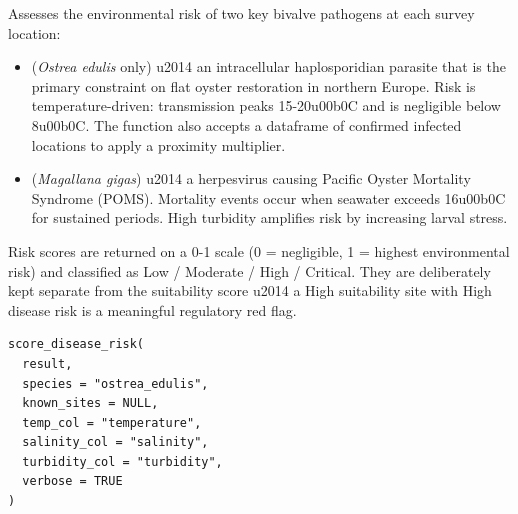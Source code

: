 \documentclass[a4paper]{book}
\begin{document}
\begin{Description}
Assesses the environmental risk of two key bivalve pathogens at each survey
location:
\begin{itemize}

\item{}  (\emph{Ostrea edulis} only) \bsl{}u2014 an intracellular haplosporidian
parasite that is the primary constraint on flat oyster restoration in northern
Europe. Risk is temperature-driven: transmission peaks 15-20\bsl{}u00b0C and is
negligible below 8\bsl{}u00b0C. The function also accepts a  dataframe of
confirmed infected locations to apply a proximity multiplier.
\item{}  (\emph{Magallana gigas}) \bsl{}u2014 a herpesvirus causing Pacific
Oyster Mortality Syndrome (POMS). Mortality events occur when seawater
exceeds 16\bsl{}u00b0C for sustained periods. High turbidity amplifies risk by
increasing larval stress.

\end{itemize}


Risk scores are returned on a 0-1 scale (0 = negligible, 1 = highest
environmental risk) and classified as Low / Moderate / High / Critical.
They are deliberately kept separate from the suitability score \bsl{}u2014 a High
suitability site with High disease risk is a meaningful regulatory red flag.
\end{Description}
%
\begin{Usage}
\begin{verbatim}
score_disease_risk(
  result,
  species = "ostrea_edulis",
  known_sites = NULL,
  temp_col = "temperature",
  salinity_col = "salinity",
  turbidity_col = "turbidity",
  verbose = TRUE
)
\end{verbatim}
\end{Usage}
%
\end{document}
